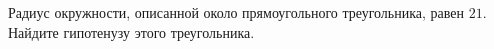 \begin{ex}
	\begin{condition}
		Радиус окружности, описанной около прямоугольного треугольника, равен \( 21 \). Найдите гипотенузу этого треугольника.
	\end{condition}
\end{ex}